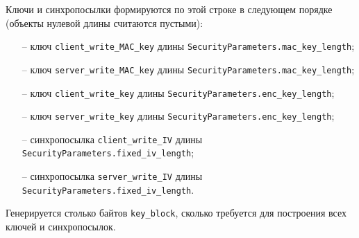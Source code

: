 Ключи и синхропосылки формируются по этой строке в следующем порядке 
(объекты нулевой длины считаются пустыми): 
\begin{itemize}
\item[--] 
ключ \lstinline{client_write_MAC_key} длины 
\lstinline{SecurityParameters.mac_key_length}; 

\item[--]
ключ \lstinline{server_write_MAC_key} длины 
\lstinline{SecurityParameters.mac_key_length}; 

\item[--]
ключ \lstinline{client_write_key} длины 
\lstinline{SecurityParameters.enc_key_length}; 

\item[--]
ключ \lstinline{server_write_key} длины 
\lstinline{SecurityParameters.enc_key_length}; 

\item[--]
синхропосылка \lstinline{client_write_IV} длины 
\lstinline{SecurityParameters.fixed_iv_length}; 

\item[--]
синхропосылка \lstinline{server_write_IV} длины 
\lstinline{SecurityParameters.fixed_iv_length}. 
\end{itemize}

Генерируется столько байтов \lstinline{key_block}, сколько требуется для 
построения всех ключей и синхропосылок. 


